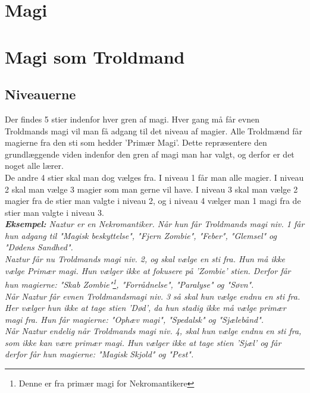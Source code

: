 \chapter*{Magi}



\chapter*{Magi som Troldmand}

\section*{Niveauerne}
Der findes 5 stier indenfor hver gren af magi. Hver gang må får evnen Troldmands magi vil man få adgang til det niveau af magier. Alle Troldmænd får magierne fra den sti som hedder 'Primær Magi'. Dette repræsentere den grundlæggende viden indenfor den gren af magi man har valgt, og derfor er det noget alle lærer.\\
De andre 4 stier skal man dog vælges fra. I niveau 1 får man alle magier. I niveau 2 skal man vælge 3 magier som man gerne vil have. I niveau 3 skal man vælge 2 magier fra de stier man valgte i niveau 2, og i niveau 4 vælger man 1 magi fra de stier man valgte i niveau 3. \\
\textit{\textbf{Eksempel:} Naztur er en Nekromantiker. Når hun får Troldmands magi niv. 1 får hun adgang til "Magisk beskyttelse", "Fjern Zombie", "Feber", "Glemsel" og "Dødens Sandhed".\\ Naztur får nu Troldmands magi niv. 2, og skal vælge en sti fra. Hun må ikke vælge Primær magi. Hun vælger ikke at fokusere på 'Zombie' stien. Derfor får hun magierne: "Skab Zombie"\footnote{Denne er fra primær magi for Nekromantikere}, "Forrådnelse", "Paralyse" og "Søvn".\\ Når Naztur får evnen Troldmandsmagi niv. 3 så skal hun vælge endnu en sti fra. Her vælger hun ikke at tage stien 'Død', da hun stadig ikke må vælge primær magi fra. Hun får magierne: "Ophæv magi", "Spedalsk" og "Sjælebånd".\\
Når Naztur endelig når Troldmands magi niv. 4, skal hun vælge endnu en sti fra, som ikke kan være primær magi. Hun vælger ikke at tage stien 'Sjæl' og får derfor får hun magierne: "Magisk Skjold" og "Pest".}


